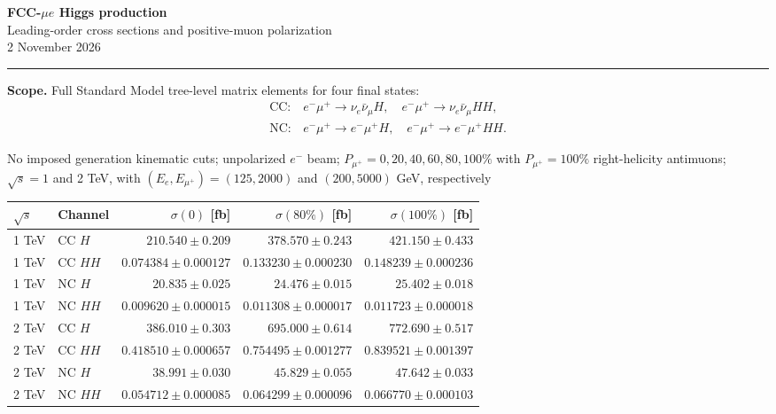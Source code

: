 \documentclass[10pt,a4paper]{article}
\newcommand{\pol}{P_{\mu^+}}
\newcommand{\sqrts}{\sqrt{s}}
\begin{document}
	
{\Huge\bfseries\color{navy} FCC-$\mu e$ Higgs production}\\[5pt]
{\Large Leading-order cross sections and positive-muon polarization}\\[10pt]
{\color{muted}2 November 2026}

\vspace{8pt}\hrule\vspace{12pt}
\textbf{Scope.} Full Standard Model tree-level matrix elements for four final states:
\[
\begin{array}{ll}
\mathrm{CC}: & e^-\mu^+\to\nu_e\bar\nu_\mu H,\quad e^-\mu^+\to\nu_e\bar\nu_\mu HH,\\
\mathrm{NC}: & e^-\mu^+\to e^-\mu^+H,\quad e^-\mu^+\to e^-\mu^+HH.
\end{array}
\]

No imposed generation kinematic cuts; unpolarized $e^-$ beam; $\pol=0,20,40,60,80,100\%$ with $\pol=100\%$ right-helicity antimuons; 
$\sqrts=1$ and 2 TeV, with $(E_e,E_{\mu^+})=(125,2000)$ and $(200,5000)$ GeV, respectively


\vspace{5pt}
\begin{center}
\small
\begin{tabular}{llrrr}\toprule
$\sqrts$ & Channel & $\sigma(0)$ [fb] & $\sigma(80\%)$ [fb] & $\sigma(100\%)$ [fb]\\\midrule
1 TeV & CC $H$ & $210.540\pm0.209$ & $378.570\pm0.243$ & $421.150\pm0.433$ \\
1 TeV & CC $HH$ & $0.074384\pm0.000127$ & $0.133230\pm0.000230$ & $0.148239\pm0.000236$ \\
1 TeV & NC $H$ & $20.835\pm0.025$ & $24.476\pm0.015$ & $25.402\pm0.018$ \\
1 TeV & NC $HH$ & $0.009620\pm0.000015$ & $0.011308\pm0.000017$ & $0.011723\pm0.000018$ \\
2 TeV & CC $H$ & $386.010\pm0.303$ & $695.000\pm0.614$ & $772.690\pm0.517$ \\
2 TeV & CC $HH$ & $0.418510\pm0.000657$ & $0.754495\pm0.001277$ & $0.839521\pm0.001397$ \\
2 TeV & NC $H$ & $38.991\pm0.030$ & $45.829\pm0.055$ & $47.642\pm0.033$ \\
2 TeV & NC $HH$ & $0.054712\pm0.000085$ & $0.064299\pm0.000096$ & $0.066770\pm0.000103$ \\
\bottomrule\end{tabular}
\end{center}
\end{document}
